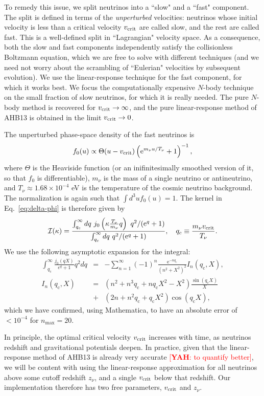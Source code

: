 \documentclass[useAMS, usenatbib]{mnras}
\newcommand{\beq}{\begin{equation}}
\newcommand{\eeq}{\end{equation}}
\newcommand{\barr}{\begin{eqnarray}}
\newcommand{\earr}{\end{eqnarray}}
\newcommand{\rme}{\textrm{e}}
\newcommand{\yah}[1]{{\textcolor{red}{[{\bf YAH}: #1]}}}
\begin{document}
To remedy this issue, we split neutrinos into a ``slow" and a ``fast" component. The split is defined in terms of the \emph{unperturbed} velocities: neutrinos whose initial velocity is less than a critical velocity $v_{\rm crit}$ are called slow, and the rest are called fast. This is a well-defined split in ``Lagrangian" velocity space. As a consequence, both the slow and fast components independently satisfy the collisionless Boltzmann equation, which we are free to solve with different techniques (and we need not worry about the scrambling of ``Eulerian" velocities by subsequent evolution). We use the linear-response technique for the fast component, for which it works best. We focus the computationally expensive $N$-body technique on the small fraction of slow neutrinos, for which it is really needed. The pure $N$-body method is recovered for $v_{\rm crit} \rightarrow \infty$, and the pure linear-response method of AHB13 is obtained in the limit $v_{\rm crit} \rightarrow 0$.

The unperturbed phase-space density of the fast neutrinos is
\beq
f_0(u) \propto \Theta(u - v_{\rm crit}) \left(\rme^{m_\nu u/T_\nu} + 1 \right)^{-1},
\eeq
where $\Theta$ is the Heaviside function (or an inifinitesimally smoothed version of it, so that $f_0$ is differentiable), $m_\nu$ is the mass of a single neutrino or antineutrino, and $T_\nu \approx 1.68 \times 10^{-4}$ eV is the temperature of the cosmic neutrino background. The normalization is again such that $\int d^3 u f_0(u) = 1$. The kernel in Eq.~\eqref{eq:delta-phi} is therefore given by
\barr
\mathcal{I}(\kappa) = \frac{\int_{q_c}^{\infty} dq~ j_0\left(\kappa \frac{T_\nu}{m_\nu}q\right)~ q^2 /(\rme^q + 1) }{\int_{q_c}^{\infty} dq ~q^2/(\rme^q + 1)}, \ \ \ q_c \equiv \frac{m_\nu v_{\rm crit}}{T_\nu}.
\earr
We use the following asymptotic expansion for the integral:
\barr
 \int^\infty_{q_\mathrm{c}} \frac{j_0(qX)}{e^q + 1} q^2 dq &=& - \sum^{\infty}_{n=1} (-1)^n \frac{\rme^{-n q_\mathrm{c}}}{(n^2+X^2)^2} I_n(q_\mathrm{c},X),\\
 I_n(q_\mathrm{c},X) &=& (n^2 + n^3 q_\mathrm{c} + n q_\mathrm{c} X^2 - X^2) \frac{\sin(q_\mathrm{c} X)}{X} \nonumber \\
 &+& (2n + n^2 q_\mathrm{c} + q_\mathrm{c} X^2) \cos(q_\mathrm{c} X),
\earr
which we have confirmed, using Mathematica, to have an absolute error of $< 10^{-4}$ for $n_\mathrm{max} = 20$.

In principle, the optimal critical velocity $v_{\rm crit}$ increases with time, as neutrinos redshift and gravitational potentials deepen. In practice, given that the linear-response method of AHB13 is already very accurate \yah{to quantify better}, we will be content with using the linear-response approximation for all neutrinos above some cutoff redshift $z_{\nu}$, and a single $v_{\rm crit}$ below that redshift. Our implementation therefore has two free parameters, $v_{\rm crit}$ and $z_{\nu}$.
\end{document}
